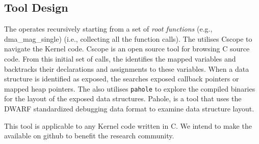 \subsection{Tool Design}
The \tool operates recursively starting from a set of \textit{root functions} (e.g., dma\_mag\_single) (i.e., collecting all the function calls). The \tool utilises Cscope \cite{cscope,cscope_92} to navigate the Kernel code. Cscope is an open source tool for browsing C source code. From this initial set of calls, the \tool identifies the mapped variables and backtracks their declarations and assignments to these variables. When a data structure is identified as exposed, the \tool searches
exposed callback pointers or mapped heap pointers. The \tool also utilises \texttt{pahole}\cite{dwarves} to explore the compiled binaries for the layout of the exposed data structures. Pahole, is a tool that uses the DWARF\cite{dwarf} standardized debugging data format to examine data structure layout.

This tool is applicable to any Kernel code written in C. We intend to make the \tool available on github to benefit the research community.


